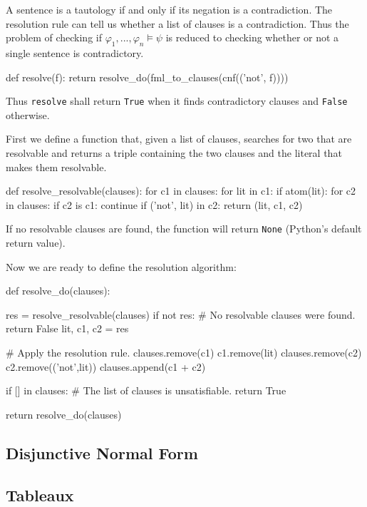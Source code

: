 \documentclass[a4paper,notitlepage]{scrartcl}
\let\phi\varphi
\begin{document}
A sentence is a tautology if and only if its negation is a contradiction.
The resolution rule can tell us whether a list of clauses is a contradiction.
Thus the problem of checking if $\phi_1,...,\phi_n\models\psi$ is reduced
   to checking whether or not a single sentence is contradictory.

\begin{code}
def resolve(f):
    return resolve_do(fml_to_clauses(cnf(('not', f))))
\end{code}

Thus \texttt{resolve} shall return \texttt{True} when it finds 
   contradictory clauses and \texttt{False} otherwise.

First we define a function that, given a list of clauses, searches for two
   that are resolvable and returns a triple containing the two clauses
   and the literal that makes them resolvable.

\begin{code}
def resolve_resolvable(clauses):
    for c1 in clauses:
        for lit in c1:
            if atom(lit):
                for c2 in clauses:
                    if c2 is c1:
                        continue
                    if ('not', lit) in c2:
                        return (lit, c1, c2)
\end{code}
If no resolvable clauses are found, the function will return \texttt{None}
   (Python's default return value).

Now we are ready to define the resolution algorithm:

\begin{code}
def resolve_do(clauses):

    res = resolve_resolvable(clauses)
    if not res:
        # No resolvable clauses were found.
        return False
    lit, c1, c2 = res

    # Apply the resolution rule.
    clauses.remove(c1)
    c1.remove(lit)
    clauses.remove(c2)
    c2.remove(('not',lit))
    clauses.append(c1 + c2)

    if [] in clauses:
        # The list of clauses is unsatisfiable.
        return True

    return resolve_do(clauses)
\end{code}


\subsection{Disjunctive Normal Form}

\subsection{Tableaux}
\end{document}
